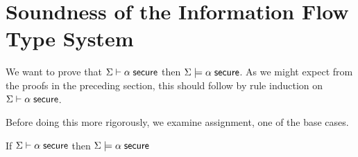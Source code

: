 \documentclass[11pt]{article}
\begin{document}
\section{Soundness of the Information Flow Type System}

We want to prove that $\Sigma \vdash \alpha\; \mathsf{secure}$ then
$\Sigma \models \alpha\; \mathsf{secure}$.  As we might expect from the proofs in
the preceding section, this should follow by rule induction on
$\Sigma \vdash \alpha\; \mathsf{secure}$.

Before doing this more rigorously, we examine assignment, one of the
base cases.

\begin{theorem}
  If $\Sigma \vdash \alpha\; \mathsf{secure}$
  then $\Sigma \models \alpha\; \mathsf{secure}$
\end{theorem}
\end{document}
